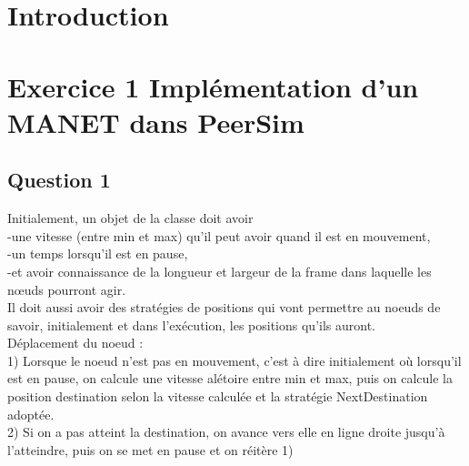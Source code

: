 \documentclass[10pt]{report}
\begin{document}
\tableofcontents
\newpage
\sectionfont{\scshape}
\section{Introduction}
\section{Exercice 1  Implémentation d'un MANET dans PeerSim}
\subsection{Question 1}

Initialement, un objet de la classe doit avoir \\
-une vitesse (entre min et max) qu'il peut avoir quand il est en mouvement, \\
-un temps lorsqu'il est en pause, \\
-et avoir connaissance de la longueur et largeur de la frame dans laquelle les nœuds pourront agir. \\
Il doit aussi avoir des stratégies de positions qui vont permettre au noeuds de savoir, initialement et dans l'exécution, les positions qu'ils auront. \\
Déplacement du noeud : \\
1) Lorsque le noeud n'est pas en mouvement, c'est à dire initialement où lorsqu'il est en pause, on calcule une vitesse alétoire entre min et max, puis on calcule la position destination selon la vitesse calculée et la stratégie NextDestination adoptée. \\
2) Si on a pas atteint la destination, on avance vers elle en ligne droite jusqu'à l'atteindre, puis on se met en pause et on réitère 1) \\
\end{document}
